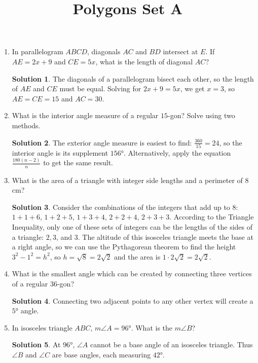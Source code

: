 \documentclass{article}
\title{Polygons Set A}
\author{}
\date{}
\theoremstyle{definition}
\newtheorem*{solution}{Solution}
\begin{document}
\maketitle

\begin{multicols}{2}
    \begin{enumerate}
        \item In parallelogram $ABCD$, diagonals $AC$ and $BD$ intersect at $E$.
            If $AE = 2x + 9$ and $CE = 5x$, what is the length of diagonal $AC$?
            \begin{solution}
                The diagonals of a parallelogram bisect each other, so the length of $AE$ and $CE$ must be equal.
                Solving for $2x + 9 = 5x$, we get $x = 3$, so $AE = CE = 15$ and $AC = 30$.
            \end{solution}
        \item What is the interior angle measure of a regular $15$-gon?
            Solve using two methods.
            \begin{solution}
                The exterior angle measure is easiest to find: $\frac{360}{15} = 24$, so the interior angle is its supplement $\ang{156}$.
                Alternatively, apply the equation $\frac{180(n - 2)}{n}$ to get the same result.
            \end{solution}
        \item What is the area of a triangle with integer side lengths and a perimeter of $8$ cm?
            \begin{solution}
                Consider the combinations of the integers that add up to $8$: $1 + 1 + 6$, $1 + 2 + 5$, $1 + 3 + 4$, $2 + 2+ 4$, $2 + 3 + 3$.
                According to the Triangle Inequality, only one of these sets of integers can be the lengths of the sides of a triangle: $2, 3$, and $3$.
                The altitude of this isosceles triangle meets the base at a right angle, so we can use the Pythagorean theorem to find the height $3^2 -1^2 = h^2$, so $h = \sqrt{8} = 2\sqrt{2}$ and the area is $1 \cdot 2\sqrt{2} = 2\sqrt{2}$.
            \end{solution}
        \item What is the smallest angle which can be created by connecting three vertices of a regular $36$-gon?
            \begin{solution}
                Connecting two adjacent points to any other vertex will create a $\ang{5}$ angle.
            \end{solution}
        \item In isosceles triangle $ABC$, $m\angle A = \ang{96}$.
            What is the $m\angle B$?
            \begin{solution}
                At $\ang{96}$, $\angle A$ cannot be a base angle of an isosceles triangle.
                Thus $\angle B$ and $\angle C$ are base angles, each measuring $\ang{42}$.
            \end{solution}
    \end{enumerate}
\end{multicols}
\end{document}
